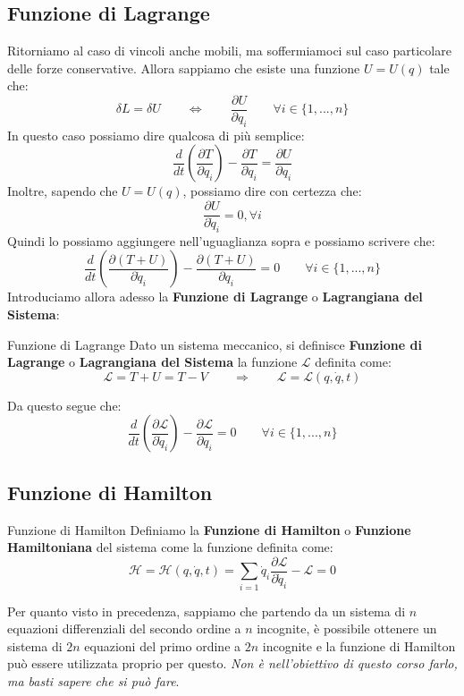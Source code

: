 \documentclass[11pt,a4paper,twoside]{article}
\theoremstyle{definition}
\begin{document}
\subsection{Funzione di Lagrange}

Ritorniamo al caso di vincoli anche mobili, ma soffermiamoci sul caso particolare delle forze conservative. Allora sappiamo che esiste una funzione $U = U(q)$ tale che:
\[ \delta L = \delta U \qquad \Leftrightarrow \qquad \frac{\partial U}{\partial q_i} \qquad \forall i \in \{1,...,n\} \]
In questo caso possiamo dire qualcosa di più semplice:
\[ \frac{d}{dt}\left( \frac{\partial T}{\partial q_i} \right) -\frac{\partial T}{\partial q_i} = \frac{\partial U}{\partial q_i} \]
Inoltre, sapendo che $U = U(q)$, possiamo dire con certezza che:
\[ \frac{\partial U}{\partial \dot q_i} = 0, \forall i \]
Quindi lo possiamo aggiungere nell'uguaglianza sopra e possiamo scrivere che:
\[ \frac{d}{dt}\left( \frac{\partial (T+U)}{\partial \dot q_i} \right) - \frac{\partial (T+U)}{\partial q_i} = 0 \qquad \forall i \in\{1,...,n\}\]
Introduciamo allora adesso la \textbf{Funzione di Lagrange} o \textbf{Lagrangiana del Sistema}:
\begin{defn}{Funzione di Lagrange}{}
	Dato un sistema meccanico, si definisce \textbf{Funzione di Lagrange} o \textbf{Lagrangiana del Sistema} la funzione $\mathcal L$ definita come:
	\[ \mathcal L = T+U = T-V \qquad \Rightarrow \qquad \mathcal L = \mathcal L(q, \dot q, t) \]
\end{defn}

Da questo segue che:
\[ \frac d{dt}\left(\frac{\partial \mathcal L}{\partial \dot q_i}\right) - \frac{\partial \mathcal L}{\partial q_i} =0 \qquad \forall i \in \{1,...,n\} \]

\subsection{Funzione di Hamilton}

\begin{defn}{Funzione di Hamilton}{}
	Definiamo la \textbf{Funzione di Hamilton} o \textbf{Funzione Hamiltoniana} del sistema come la funzione definita come:
	\[ \mathcal H = \mathcal H(q, \dot q, t) = \sum_{i=1} \dot q_i \frac{\partial \mathcal L}{\partial \dot q_i} - \mathcal L = 0\]
\end{defn}

Per quanto visto in precedenza, sappiamo che partendo da un sistema di $n$ equazioni differenziali del secondo ordine a $n$ incognite, è possibile ottenere un sistema di $2n$ equazioni del primo ordine a $2n$ incognite e la funzione di Hamilton può essere utilizzata proprio per questo. \textit{Non è nell'obiettivo di questo corso farlo, ma basti sapere che si può fare}.
\end{document}
